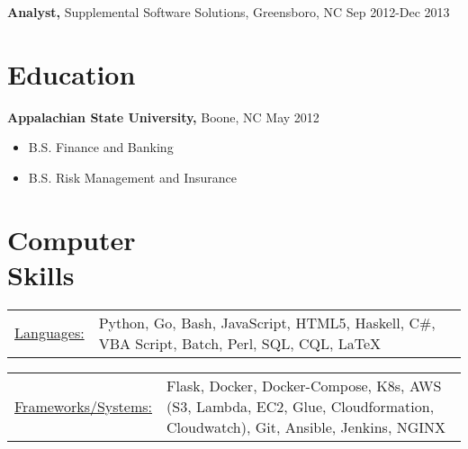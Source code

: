 \documentclass{res}
\begin{document}
\begin{resume}
 
  {\bf Analyst,} Supplemental Software Solutions, Greensboro, NC \hfill  Sep 2012-Dec 2013
    
\section{Education} 
  {\bf Appalachian State University,} Boone, NC \hfill May 2012
    \begin{itemize} \itemsep -2pt
      \item B.S. Finance and Banking
      \item B.S. Risk Management and Insurance
    \end{itemize}

\section{Computer \\ Skills}
   \begin{tabular}{l p{5in}}
    \underline{Languages:} & \raggedright Python, Go, Bash, JavaScript, HTML5, Haskell, C\#, VBA Script, Batch, Perl, SQL, CQL, \LaTeX\\
   \end{tabular}
   \begin{tabular}{l p{5in}}
       \underline{Frameworks/Systems:} & \raggedright Flask, Docker, Docker-Compose, K8s, AWS (S3, Lambda, EC2, Glue, Cloudformation, Cloudwatch), Git, Ansible, Jenkins, NGINX
 \end{tabular}
\end{resume} 
\end{document}
